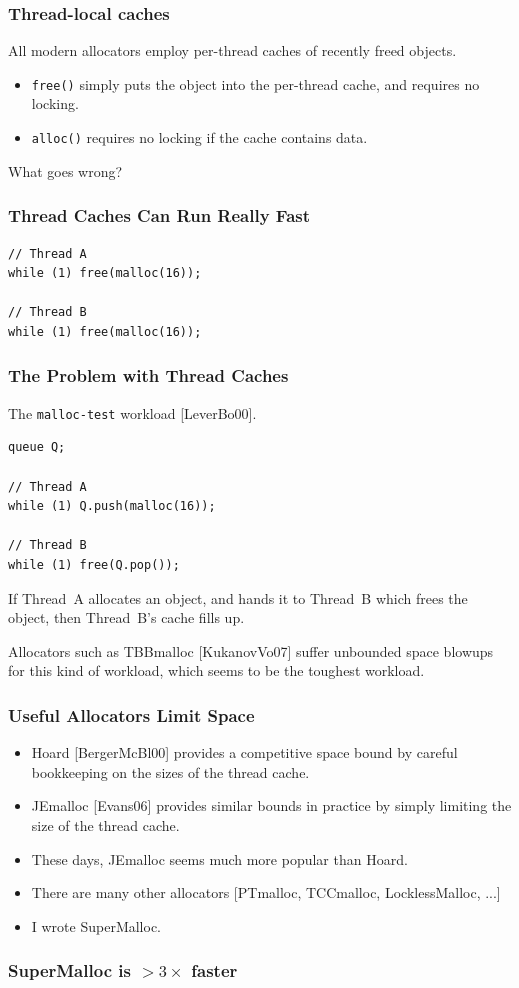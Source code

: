\documentclass[xcolor=dvipsnames,14pt]{beamer}
\begin{document}
\begin{frame}
\frametitle{Thread-local caches}

All modern allocators employ per-thread caches of recently freed objects.

\begin{itemize}
\item \texttt{free()} simply puts the object into the
  per-thread cache, and requires no locking.
\item \texttt{alloc()} requires no locking if the cache contains data.
\end{itemize}

What goes wrong?
\end{frame}

\begin{frame}[fragile]
\frametitle{Thread Caches Can Run Really Fast}

\begin{verbatim}
// Thread A
while (1) free(malloc(16));

// Thread B
while (1) free(malloc(16));
\end{verbatim}
\end{frame}

\begin{frame}[fragile]
\frametitle{The Problem with Thread Caches}

The \texttt{malloc-test} workload [LeverBo00].

\begin{verbatim}
queue Q;

// Thread A
while (1) Q.push(malloc(16));

// Thread B
while (1) free(Q.pop());
\end{verbatim}


If Thread~A allocates an object, and hands it to Thread~B which frees
the object, then Thread~B's cache fills up.

Allocators such as TBBmalloc [KukanovVo07] suffer unbounded space
blowups for this kind of workload, which seems to be the toughest workload.
\end{frame}

\begin{frame}
\frametitle{Useful Allocators Limit Space}

\begin{itemize}
\item Hoard [BergerMcBl00] provides a competitive space bound by careful
bookkeeping on the sizes of the thread cache.

\item JEmalloc [Evans06] provides similar bounds in practice by simply
limiting the size of the thread cache.

\item These days, JEmalloc seems much more popular than Hoard.

\item There are many other allocators [PTmalloc, TCCmalloc, LocklessMalloc, ...]

\item I wrote SuperMalloc.
\end{itemize}

\end{frame}

\begin{frame}
\frametitle{SuperMalloc is $>3\times$ faster}


\end{frame}
\end{document}

